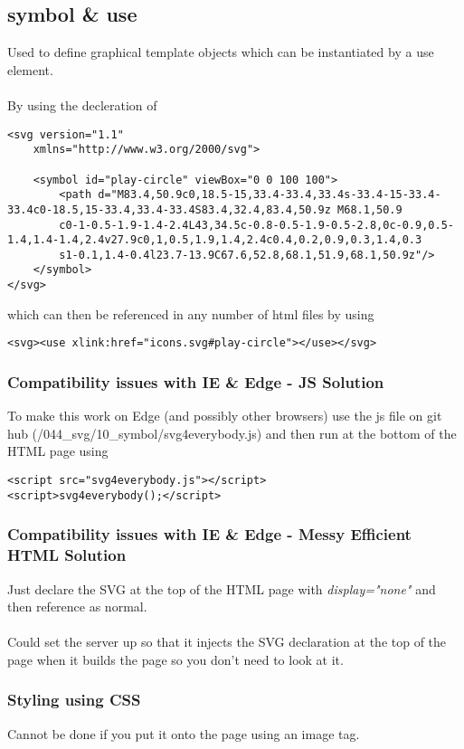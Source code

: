 \documentclass[]{article}
\newcommand{\<}{\guilsinglleft}
\renewcommand{\>}{\guilsinglright}
\renewcommand{\it}[1]{\textit{#1}}
\begin{document}
\subsection{\<symbol\> \& \<use\>}
Used to define graphical template objects which can be instantiated by a use element.
\\\\
By using the decleration of 
\begin{lstlisting}
<svg version="1.1"
	xmlns="http://www.w3.org/2000/svg">
	
	<symbol id="play-circle" viewBox="0 0 100 100">
		<path d="M83.4,50.9c0,18.5-15,33.4-33.4,33.4s-33.4-15-33.4-33.4c0-18.5,15-33.4,33.4-33.4S83.4,32.4,83.4,50.9z M68.1,50.9
		c0-1-0.5-1.9-1.4-2.4L43,34.5c-0.8-0.5-1.9-0.5-2.8,0c-0.9,0.5-1.4,1.4-1.4,2.4v27.9c0,1,0.5,1.9,1.4,2.4c0.4,0.2,0.9,0.3,1.4,0.3
		s1-0.1,1.4-0.4l23.7-13.9C67.6,52.8,68.1,51.9,68.1,50.9z"/>
	</symbol>
</svg>	
\end{lstlisting}
which can then be referenced in any number of html files by using 
\begin{lstlisting}
<svg><use xlink:href="icons.svg#play-circle"></use></svg>
\end{lstlisting}
\subsubsection{Compatibility issues with IE \& Edge - JS Solution}
To make this work on Edge (and possibly other browsers) use the js file on git hub (/044\_svg/10\_symbol/svg4everybody.js) and then run at the bottom of the HTML page using
\begin{lstlisting}
<script src="svg4everybody.js"></script>
<script>svg4everybody();</script>
\end{lstlisting}

\subsubsection{Compatibility issues with IE \& Edge - Messy Efficient HTML Solution}
Just declare the SVG at the top of the HTML page with \it{display="none"} and then reference as normal.
\\\\
Could set the server up so that it injects the SVG declaration at the top of the page when it builds the page so you don't need to look at it.

\subsubsection{Styling using CSS}
Cannot be done if you put it onto the page using an image tag.
\end{document}
